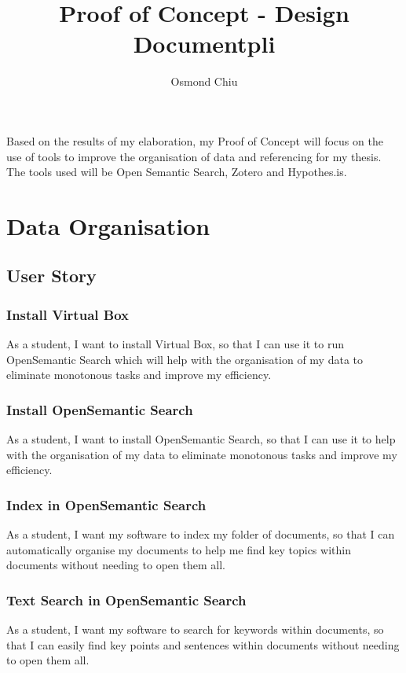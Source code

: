 \documentclass{article}
\title{Proof of Concept - Design Documentpli}
\author{Osmond Chiu}
\begin{document}
\maketitle

Based on the results of my elaboration, my Proof of Concept will focus on the use of tools to improve the organisation of data and referencing for my thesis. The tools used will be Open Semantic Search, Zotero and Hypothes.is.

\section*{Data Organisation}
\subsection*{User Story}

\subsubsection*{Install Virtual Box}

As a student, I want to install Virtual Box, so that I can use it to run OpenSemantic Search which will help with the organisation of my data to eliminate monotonous tasks and improve my efficiency.

\subsubsection*{Install OpenSemantic Search}

As a student, I want to install OpenSemantic Search, so that I can use it to help with the organisation of my data to eliminate monotonous tasks and improve my efficiency.

\subsubsection*{Index in OpenSemantic Search}

As a student, I want my software to index my folder of documents, so that I can automatically organise my documents to help me find key topics within documents without needing to open them all.

\subsubsection*{Text Search in OpenSemantic Search}

As a student, I want my software to search for keywords within documents, so that I can easily find key points and sentences within documents without needing to open them all.
\end{document}
